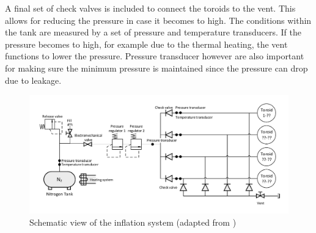 A final set of check valves is included to connect the toroids to the vent. This allows for reducing the pressure in case it becomes to high. The conditions within the tank are measured by a set of pressure and temperature transducers. If the pressure becomes to high, for example due to the thermal heating, the vent functions to lower the pressure. Pressure transducer however are also important for making sure the minimum pressure is maintained since the pressure can drop due to leakage. 

\begin{figure}[h]
		\centering
		\includegraphics[width=1.0\textwidth]{./Figure/Structure/infsys.pdf}
		\caption{Schematic view of the inflation system (adapted from \cite{Hughes2005})}
		\label{fig:infsys}
\end{figure}






